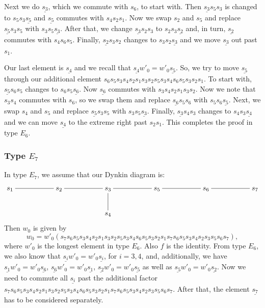 \documentclass[a4paper]{amsart}
\begin{document}
Next we do $\underline{s_{3}}$, which we commute with $s_6$, to start with.
Then $\underline{s_{3}} s_5 s_3$ is changed to $s_5 s_3\underline{s_{5}}$
and $\underline{s_{5}}$ commutes with $s_4 s_2 s_1$. Now we swap 
$s_2$ and $s_5$ and replace $\underline{s_{5}} s_3 s_5$ with
$s_3 s_5 \underline{s_{3}}$. After that, we change 
$\underline{s_{3}} s_2 s_3 $ to $s_2 s_3 \underline{s_{2}}$ and, in turn,
$\underline{s_{2}}$ commutes with $s_4 s_6 s_5$. Finally,
$\underline{s_{2}}s_3 s_2$ changes to $s_3 s_2\underline{s_{3}}$
and we move $\underline{s_{3}}$ out past $s_1$.

Our last element is $\underline{s_{4}}$ and we recall that
$\underline{s_{4}}w'_0=w'_0\underline{s_{5}}$. So, we try to 
move $\underline{s_{5}}$ through our additional element
$s_6 s_5 s_3 s_4 s_2 s_1 s_3 s_2 s_5 s_3 s_4 s_6 s_5 s_3 s_2 s_1$.
To start with, $\underline{s_{5}}s_6 s_5$ changes to
$s_6 s_5\underline{s_{6}}$. Now $\underline{s_{6}}$ commutes
with $s_3 s_4 s_2 s_1 s_3 s_2$. Now we note that $s_3s_4$
commutes with $s_6$, so we swap them and replace
$\underline{s_{6}}s_5 s_6$ with $s_5 s_6\underline{s_{5}}$.
Next, we swap $s_4$ and $s_5$ and replace 
$\underline{s_{5}}s_3 s_5$ with $s_3 s_5\underline{s_{3}}$.
Finally, $\underline{s_{3}} s_4  s_3$ changes to
$ s_4  s_3\underline{s_{4}}$ and we can move
$\underline{s_{4}}$ to the extreme right past $s_2 s_1$.
This completes the proof in type $E_6$.

\subsubsection{\bf Type $E_7$}\label{s5.2.6}

In type $E_7$, we assume that our Dynkin diagram is:
\begin{displaymath}
\xymatrix{s_1\ar@{-}[rr]&&s_2\ar@{-}[rr]&&
s_{3}\ar@{-}[rr]\ar@{-}[d]&&s_{5}\ar@{-}[rr]&&s_{6}\ar@{-}[rr]&&s_{7}\\
&&&&s_{4}&&&&} 
\end{displaymath}
Then $w_0$ is given by 
\begin{displaymath}
w_0=w'_0(s_7 s_6 s_5 s_3 s_4 s_2 s_1 s_3 s_2 
s_5 s_3 s_4 s_6 s_5 s_3 s_2 s_1 s_7 s_6 s_5 s_3 s_4 s_2
s_3 s_5 s_6 s_7),
\end{displaymath}
where $w'_0$ is the longest element in type $E_6$.
Also $f$ is the identity. From type $E_6$, we also know that 
$\underline{s_{i}}w'_0=w'_0\underline{s_{i}}$, for $i=3,4$,
and, additionally, we have  
$\underline{s_{1}}w'_0=w'_0\underline{s_{6}}$,
$\underline{s_{6}}w'_0=w'_0\underline{s_{1}}$,
$\underline{s_{2}}w'_0=w'_0\underline{s_{5}}$
as well as $\underline{s_{5}}w'_0=w'_0\underline{s_{2}}$.
Now we need to commute all $\underline{s_{i}}$ past the
additional factor 
$s_7 s_6 s_5 s_3 s_4 s_2 s_1 s_3 s_2 
s_5 s_3 s_4 s_6 s_5 s_3 s_2 s_1 s_7 s_6 s_5 s_3 s_4 s_2
s_3 s_5 s_6 s_7$.
After that, the element $\underline{s_{7}}$ has to be 
considered separately.
\end{document}
